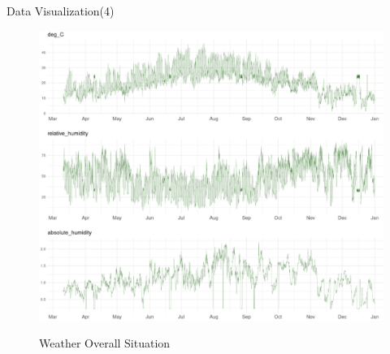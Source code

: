 \documentclass[
 size=14pt,
 paper=smartboard,  %
 mode=present, 		%
 display=slides, 	%
 style=tuliplab,  	%
 pauseslide,
 fleqn,leqno]{powerdot}
\begin{document}
\begin{slide}[toc=,bm=]{Data Visualization(4)}
	
	\begin{figure}
		\centering
        \includegraphics[scale=0.3]{figures//p4.eps}\\
		\caption{Weather Overall Situation}\label{fig:Weather Overall Situation}
	\end{figure}
	
\end{slide}
\end{document}
